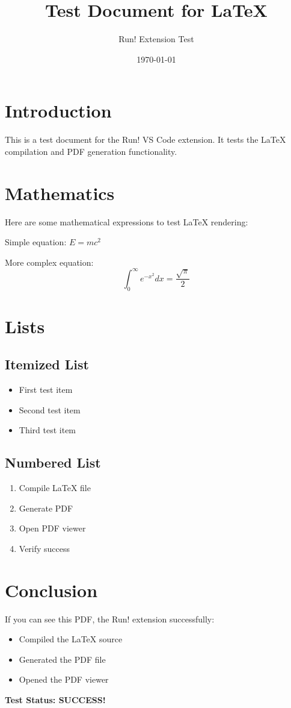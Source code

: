 \documentclass{article}
\title{Test Document for LaTeX}
\author{Run! Extension Test}
\date{\today}
\begin{document}
\maketitle

\section{Introduction}
This is a test document for the Run! VS Code extension. It tests the LaTeX compilation and PDF generation functionality.

\section{Mathematics}
Here are some mathematical expressions to test LaTeX rendering:

Simple equation: $E = mc^2$

More complex equation:
\begin{equation}
\int_0^\infty e^{-x^2} dx = \frac{\sqrt{\pi}}{2}
\end{equation}

\section{Lists}
\subsection{Itemized List}
\begin{itemize}
    \item First test item
    \item Second test item  
    \item Third test item
\end{itemize}

\subsection{Numbered List}
\begin{enumerate}
    \item Compile LaTeX file
    \item Generate PDF
    \item Open PDF viewer
    \item Verify success
\end{enumerate}

\section{Conclusion}
If you can see this PDF, the Run! extension successfully:
\begin{itemize}
    \item Compiled the LaTeX source
    \item Generated the PDF file
    \item Opened the PDF viewer
\end{itemize}

\textbf{Test Status: SUCCESS!}
\end{document}
